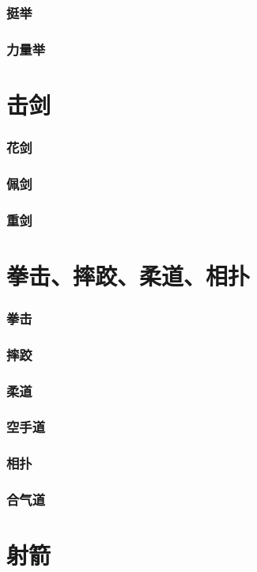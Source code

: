 \documentclass[UTF8]{../../ApplicationUniverse}
\begin{document}
    \subsubsection{挺举}
    \subsubsection{力量举}
\section{击剑}
    \subsubsection{花剑}
    \subsubsection{佩剑}
    \subsubsection{重剑}
\section{拳击、摔跤、柔道、相扑}
    \subsubsection{拳击}
    \subsubsection{摔跤}
    \subsubsection{柔道}
    \subsubsection{空手道}
    \subsubsection{相扑}
    \subsubsection{合气道}

\section{射箭}
\end{document}
